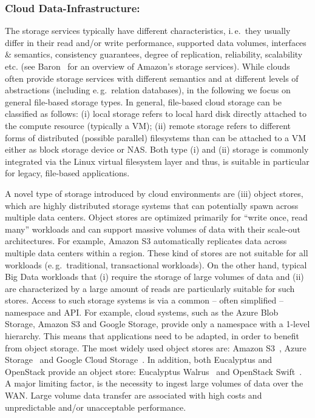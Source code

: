 \documentclass[times]{cpeauth}
\newcommand{\alnote}[1]{ {\textcolor{green} { ***andreL: #1 }}}
\newcommand{\alnote}[1]{}
\begin{document}
\subsubsection*{Cloud Data-Infrastructure: }
The storage services typically have different characteristics, i.\,e.\
they usually differ in their read and/or write performance, supported
data volumes, interfaces \& semantics, consistency guarantees, degree
of replication, reliability, scalability etc.
(see Baron~\cite{baron2010} for an overview of Amazon's storage
services). While clouds often provide storage services with different
semantics and at different levels of abstractions (including
e.\,g.\ relation databases), in the following we focus on general
file-based storage types. In general, file-based cloud storage can be
classified as follows: (i) local storage refers to local hard disk
directly attached to the compute resource (typically a VM); (ii)
remote storage refers to different forms of distributed (possible
parallel) filesystems than can be attached to a VM either as block
storage device or NAS. Both type (i) and (ii) storage is commonly
integrated via the Linux virtual filesystem layer and thus, is
suitable in particular for legacy, file-based applications.

A novel type of storage introduced by cloud environments are (iii)
object stores, which are highly distributed storage systems that can
potentially spawn across multiple data centers. Object stores are
optimized primarily for ``write once, read many'' workloads and can
support massive volumes of data with their scale-out
architectures. For example, Amazon S3 automatically replicates data
across multiple data centers within a region. These kind of stores are
not suitable for all workloads (e.\,g.\ traditional, transactional
workloads). On the other hand, typical Big Data workloads that (i)
require the storage of large volumes of data and (ii) are
characterized by a large amount of reads are particularly suitable for
such stores. Access to such storage systems is via a common -- often
simplified -- namespace and API. For example, cloud systems, such as
the Azure Blob Storage, Amazon S3 and Google Storage, provide only a
namespace with a 1-level hierarchy. This means that applications need
to be adapted, in order to benefit from object
storage. The most widely used object stores are: Amazon
S3~\cite{amazons3}, Azure Storage~\cite{azure-blob-storage} and Google
Cloud Storage~\cite{google-storage}. In addition, both Eucalyptus and
OpenStack provide an object store: Eucalyptus Walrus~\cite{walrus} and
OpenStack Swift~\cite{openstack-swift}. A major limiting factor, is
the necessity to ingest large volumes of data over the WAN. Large
volume data transfer are associated with high costs and unpredictable
and/or unacceptable performance.
\end{document}
